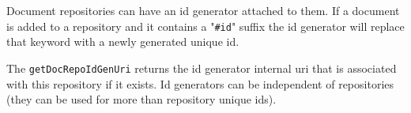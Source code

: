 Document repositories can have an id generator attached to them. If a document is added to
a repository and it contains a "\verb+#id+" suffix the id generator will replace that keyword with
a newly generated unique id.

The \verb+getDocRepoIdGenUri+ returns the id generator internal uri that is associated with
this repository if it exists. Id generators can be independent of repositories (they can be used for
more than repository unique ids).
